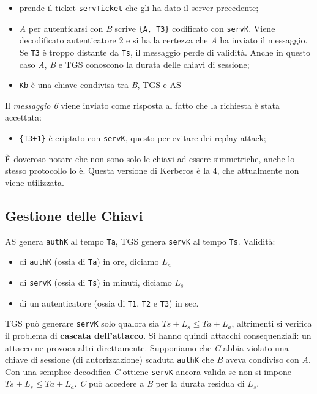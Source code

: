 \begin{itemize}
      \item prende il ticket \verb|servTicket| che gli ha dato il
            server precedente;
      \item \textit{A} per autenticarsi con \textit{B} scrive \verb|{A, T3}|
            codificato con \verb|servK|. Viene decodificato
            autenticatore 2 e si ha la certezza che \textit{A} ha inviato il
            messaggio. Se \verb|T3| è troppo distante da \verb|Ts|,
            il messaggio perde di validità. Anche in questo
            caso \textit{A}, \textit{B} e TGS conoscono la durata delle chiavi
            di sessione;
      \item \verb|Kb| è una chiave condivisa tra \textit{B}, TGS e AS
\end{itemize}

Il \textit{messaggio 6} viene inviato come risposta al fatto che la richiesta è
stata accettata:

\begin{itemize}
      \item \verb|{T3+1}| è criptato con \verb|servK|,
            questo per evitare dei replay attack;
\end{itemize}

È doveroso notare che non sono solo le chiavi ad essere simmetriche,
anche lo stesso protocollo lo è.
Questa versione di Kerberos è la 4, che attualmente non viene utilizzata.

\subsection{Gestione delle Chiavi}

AS genera \verb|authK| al tempo \verb|Ta|, TGS genera \verb|servK| al
tempo \verb|Ts|.
Validità:

\begin{itemize}
      \item di \verb|authK| (ossia di \verb|Ta|) in ore, diciamo \(L_a\)
      \item di \verb|servK| (ossia di \verb|Ts|) in minuti, diciamo \(L_s\)
      \item di un autenticatore (ossia di \verb|T1|, \verb|T2| e \verb|T3|) in sec.
\end{itemize}

TGS può generare \verb|servK| solo qualora sia \(Ts + L_s \le Ta + L_a\),
altrimenti si verifica il problema di \textbf{cascata dell’attacco}. Si hanno
quindi attacchi consequenziali: un attacco ne provoca altri direttamente.
Supponiamo che \textit{C} abbia violato una chiave di sessione (di autorizzazione)
scaduta \verb|authK| che \textit{B} aveva condiviso con \textit{A}.
Con una semplice decodifica \textit{C} ottiene \verb|servK| ancora valida
se non si impone \(Ts + L_s \le Ta + L_a\). \textit{C} può accedere a \textit{B}
per la durata residua di \(L_s\).

